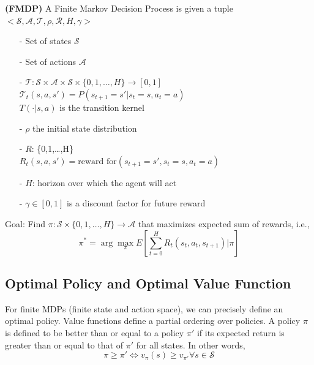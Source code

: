 \begin{definition}\label{def_FMDP} {\rm\bf (FMDP)}
A Finite Markov Decision Process is given a tuple $<\mathcal{S}, \mathcal{A}, \mathcal{T}, 
\rho, \mathcal{R}, H, \gamma>$
\begin{itemize}
\setlength{\parskip}{0pt}
\item[-]
Set of states $\mathcal{S}$

\item[-]
Set of actions $\mathcal{A}$

\item[-]
$\mathcal{T}: \mathcal{S}\times\mathcal{A}\times\mathcal{S}\times\{0,1,\ldots,H\}
\rightarrow [0,1]$ \\
$\mathcal{T}_t(s,a,s')=P(s_{t+1}=s'|s_t=s,a_t=a)$ \\
$T(\cdot \vert s,a)$ is the transition kernel

\item[-]
$\rho$ the initial state distribution

\item[-]
$R$: \times{}\times{}\times\{0,1,\ldots,H\}
\rightarrow {} \\
$R_t(s,a,s')=\text{reward for} (s_{t+1}=s', s_t=s, a_t=a)$

\item[-]
$H$: horizon over which the agent will act

\item[-]
$\gamma\in[0, 1]$ is a discount factor for future reward

\end{itemize}
\end{definition}

Goal: Find $\pi: \mathcal{S}\times\{0,1,\ldots,H\}\rightarrow \mathcal{A}$ that 
maximizes expected sum of rewards, i.e., 
$$
\pi^*=\arg\max_\pi E\left[ \sum_{t=0}^H R_t(s_t, a_t, s_{t+1}) | \pi \right]
$$


\subsection{Optimal Policy and Optimal Value Function}

For finite MDPs (finite state and action space), we can precisely define an 
optimal policy. Value functions define a partial ordering over policies. A 
policy $\pi$ is defined to be better than or equal to a policy $\pi'$ if its 
expected return is greater than or equal to that of $\pi'$ for all states. In 
other words, 
\begin{equation} 
\pi\geq\pi'\iff v_\pi(s)\geq v_{\pi'} \forall s\in\mathcal{S} 
\end{equation}

